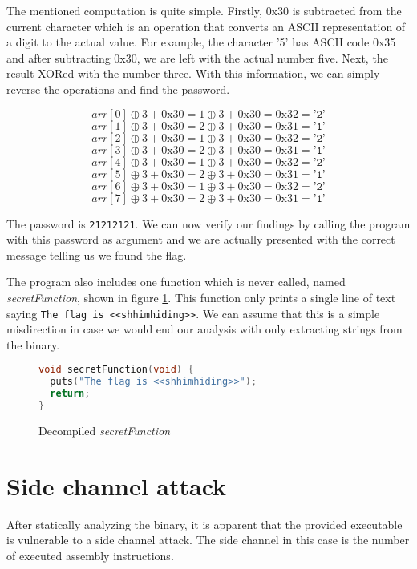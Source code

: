 \documentclass[conference]{IEEEtran}
\begin{document}
The mentioned computation is quite simple. Firstly, 0x30 is subtracted from the current character which is an operation that converts an ASCII representation of a digit to the actual value. For example, the character '5' has ASCII code 0x35 and after subtracting 0x30, we are left with the actual number five. Next, the result XORed with the number three. With this information, we can simply reverse the operations and find the password. 

$$ arr[0] \oplus 3 + \mathrm{0x30} = 1 \oplus 3 + \mathrm{0x30} = \mathrm{0x32} = \texttt{'2'} $$
$$ arr[1] \oplus 3 + \mathrm{0x30} = 2 \oplus 3 + \mathrm{0x30} = \mathrm{0x31} = \texttt{'1'} $$
$$ arr[2] \oplus 3 + \mathrm{0x30} = 1 \oplus 3 + \mathrm{0x30} = \mathrm{0x32} = \texttt{'2'} $$
$$ arr[3] \oplus 3 + \mathrm{0x30} = 2 \oplus 3 + \mathrm{0x30} = \mathrm{0x31} = \texttt{'1'} $$
$$ arr[4] \oplus 3 + \mathrm{0x30} = 1 \oplus 3 + \mathrm{0x30} = \mathrm{0x32} = \texttt{'2'} $$
$$ arr[5] \oplus 3 + \mathrm{0x30} = 2 \oplus 3 + \mathrm{0x30} = \mathrm{0x31} = \texttt{'1'} $$
$$ arr[6] \oplus 3 + \mathrm{0x30} = 1 \oplus 3 + \mathrm{0x30} = \mathrm{0x32} = \texttt{'2'} $$
$$ arr[7] \oplus 3 + \mathrm{0x30} = 2 \oplus 3 + \mathrm{0x30} = \mathrm{0x31} = \texttt{'1'} $$

The password is \texttt{21212121}. We can now verify our findings by calling the program with this password as argument and we are actually presented with the correct message telling us we found the flag.

The program also includes one function which is never called, named \textit{secretFunction}, shown in figure \ref{fig:secret-fn}. This function only prints a single line of text saying \texttt{The flag is <<shhimhiding>>}. We can assume that this is a simple misdirection in case we would end our analysis with only extracting strings from the binary.

\begin{figure}[ht!]
    \begin{lstlisting}[language=c]
void secretFunction(void) {
  puts("The flag is <<shhimhiding>>");
  return;
}
    \end{lstlisting}
    \caption{Decompiled \textit{secretFunction}}
    \label{fig:secret-fn}
\end{figure}


\section{Side channel attack}
After statically analyzing the binary, it is apparent that the provided executable is vulnerable to a side channel attack. The side channel in this case is the number of executed assembly instructions.
\end{document}
